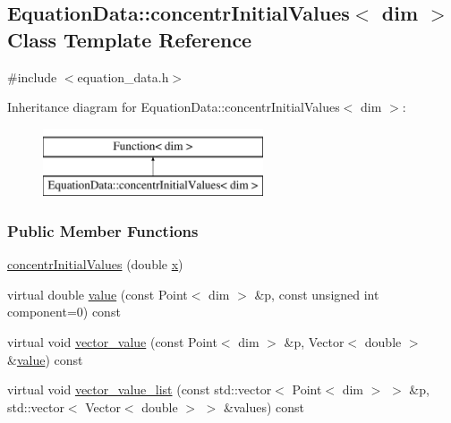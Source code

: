 \hypertarget{class_equation_data_1_1concentr_initial_values}{}\subsection{Equation\+Data\+:\+:concentr\+Initial\+Values$<$ dim $>$ Class Template Reference}
\label{class_equation_data_1_1concentr_initial_values}


{\ttfamily \#include $<$equation\+\_\+data.\+h$>$}

Inheritance diagram for Equation\+Data\+:\+:concentr\+Initial\+Values$<$ dim $>$\+:\begin{figure}[H]
\begin{center}
\leavevmode
\includegraphics[height=2.000000cm]{class_equation_data_1_1concentr_initial_values}
\end{center}
\end{figure}
\subsubsection*{Public Member Functions}
\begin{DoxyCompactItemize}
\item 
\hyperlink{class_equation_data_1_1concentr_initial_values_a5cb78258be9e0add00e7155fdb7e16e6}{concentr\+Initial\+Values} (double \hyperlink{class_equation_data_1_1concentr_initial_values_a3f0d3b7f4b1d02908f38d83d855718ea}{x})
\item 
virtual double \hyperlink{class_equation_data_1_1concentr_initial_values_a9b67003948ed9e58aece49100f657515}{value} (const Point$<$ dim $>$ \&p, const unsigned int component=0) const 
\item 
virtual void \hyperlink{class_equation_data_1_1concentr_initial_values_a45d0821e98083c9b5dc4b089dc796cb5}{vector\+\_\+value} (const Point$<$ dim $>$ \&p, Vector$<$ double $>$ \&\hyperlink{class_equation_data_1_1concentr_initial_values_a9b67003948ed9e58aece49100f657515}{value}) const 
\item 
virtual void \hyperlink{class_equation_data_1_1concentr_initial_values_a9f23343e83a28890a58ac750ce3379a4}{vector\+\_\+value\+\_\+list} (const std\+::vector$<$ Point$<$ dim $>$ $>$ \&p, std\+::vector$<$ Vector$<$ double $>$ $>$ \&values) const 
\end{DoxyCompactItemize}
